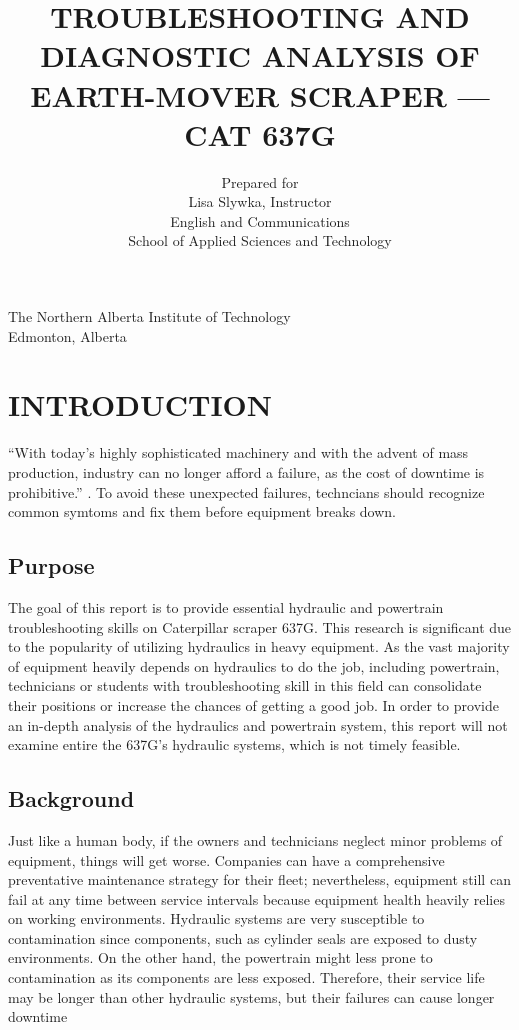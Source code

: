 \documentclass[a4paper,man,natbib]{apa6}
\title{\textbf{TROUBLESHOOTING AND DIAGNOSTIC ANALYSIS OF EARTH-MOVER SCRAPER --- CAT 637G}}
\author{Prepared for

Lisa Slywka, Instructor

English and Communications

School of Applied Sciences and Technology
}
\affiliation{Prepared by

Tai Tran, 200222333

Industrial Heavy Equipment Technician Program

School of Applied Trades

October 31, 2016
}
\begin{document}
\centering The Northern Alberta Institute of Technology\\ Edmonton, Alberta

\maketitle

\tableofcontents
\newpage

\listoffigures
\newpage

\listoftables
\newpage



\section{INTRODUCTION}

``With today's highly sophisticated machinery and with the advent of mass production, industry can no longer afford a failure, as the cost of downtime is prohibitive.'' \citep[p. 190]{DodPracHyd}. To avoid these unexpected failures, techncians should recognize common symtoms and fix them before equipment breaks down.

\subsection{Purpose}

The goal of this report is to provide essential hydraulic and powertrain troubleshooting skills on Caterpillar scraper 637G. This research is significant due to the popularity of utilizing hydraulics in heavy equipment. As the vast majority of equipment heavily depends on hydraulics to do the job, including powertrain, technicians or students with troubleshooting skill in this field can consolidate their positions or increase the chances of getting a good job. In order to provide an in-depth analysis of the hydraulics and powertrain system, this report will not examine entire the 637G's hydraulic systems, which is not timely feasible.

\subsection{Background}

Just like a human body, if the owners and technicians neglect minor problems of equipment, things will get worse. Companies can have a comprehensive preventative maintenance strategy for their fleet; nevertheless, equipment still can fail at any time between service intervals because equipment health heavily relies on working environments. Hydraulic systems are very susceptible to contamination since components, such as cylinder seals are exposed to dusty environments. On the other hand, the powertrain might less prone to contamination as its components are less exposed. Therefore, their service life may be longer than other hydraulic systems, but their failures can cause longer downtime
\end{document}
